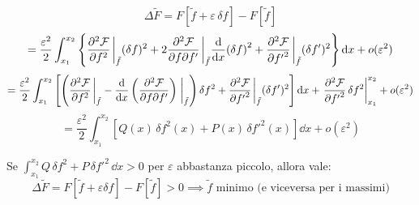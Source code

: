 \begin{equation*}
    \Delta \tilde{F} = F\left[ \tilde{f} + \varepsilon \, \delta f \right] - F[\tilde{f}]   
\end{equation*}
\begin{equation*}
    = \frac{\varepsilon^2}{2} \int_{x_1}^{x_2} \left\{
    \pdv[2]{\mathcal{F}}{f}\eval_{\tilde{f}} (\delta f)^2 
    + 2 \pdv[2]{\mathcal{F}}{f}{{f'}}\eval_{\tilde{f}} \dv{x}(\delta f)^2 
    + \pdv[2]{\mathcal{F}}{{f'}}\eval_{\tilde{f}} (\delta f')^2 
    \right\} \dd{x} + o(\varepsilon^2)
\end{equation*}
\begin{equation*}
    = \frac{\varepsilon^2}{2} \int_{x_1}^{x_2} \left[
    \left( \pdv[2]{\mathcal{F}}{f} \eval_{\tilde{f}}
    - \dv{x} \left( \pdv[2]{\mathcal{F}}{f}{{f'}} \right)\eval_{\tilde{f}}
    \right) \delta f^2+
    \pdv[2]{\mathcal{F}}{{f'}}\eval_{\tilde{f}} (\delta f')^2 \right] \dd{x}
    + \eval{\pdv[2]{\mathcal{F}}{{f'}} \, \delta f^2}_{x_1}^{x_2}
    + o(\varepsilon^2)
\end{equation*}
\begin{equation*}
    = \frac{\varepsilon^2}{2} \int_{x_1}^{x_2}
    \left[ Q(x) \, \delta f^2(x)+ P(x) \, \delta f'^2(x) \right] \dd{x} + o(\varepsilon^2)
\end{equation*}

Se $\int_{x_1}^{x_2} Q\, \delta f^2 + P\, \delta f'^2\, \dd{x} > 0 $ per $\varepsilon$ abbastanza piccolo,
allora vale:
\begin{equation*}
\Delta \tilde{F} = F\left[ \tilde{f} + \varepsilon \delta f \right] - F[\tilde{f}] > 0
\implies \tilde{f} \text{ minimo (e viceversa per i massimi)}
\end{equation*}

